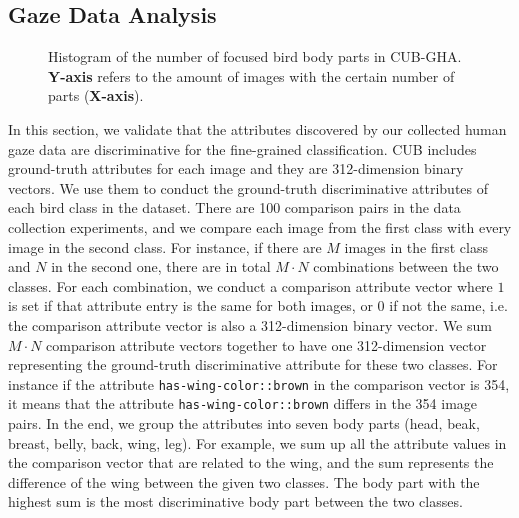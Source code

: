 \documentclass{bmvc2k}
\begin{document}
\subsection{Gaze Data Analysis}

\begin{figure}[t]
    \centering
    \vspace{0.2cm}
    \caption{Histogram of the number of focused bird body parts in CUB-GHA. \textbf{Y-axis} refers to the amount of images with the certain number of parts (\textbf{X-axis}).}
    \label{fig:bar chart}
\end{figure}

In this section, we validate that the attributes discovered by our collected human gaze data are discriminative for the fine-grained classification. CUB includes ground-truth attributes for each image and they are 312-dimension binary vectors.
We use them to conduct the ground-truth discriminative attributes of each bird class in the dataset. There are 100 comparison pairs in the data collection experiments, and we compare each image from the first class with every image in the second class. For instance, if there are $M$ images in the first class and $N$ in the second one, there are in total $M\cdot N$ combinations between the two classes. For each combination, we conduct a comparison attribute vector where $1$ is set if that attribute entry is the same for both images, or $0$ if not the same, i.e. the comparison attribute vector is also a 312-dimension binary vector. We sum $M\cdot N$ comparison attribute vectors together to have one 312-dimension vector representing the ground-truth discriminative attribute for these two classes. For instance if the attribute \texttt{has-wing-color::brown} in the comparison vector is 354, it means that the attribute \texttt{has-wing-color::brown} differs in the 354 image pairs. In the end, we group the attributes into seven body parts (head, beak, breast, belly, back, wing, leg). For example, we sum up all the attribute values in the comparison vector that are related to the wing, and the sum represents the difference of the wing between the given two classes. The body part with the highest sum is the most discriminative body part between the two classes.
\end{document}
